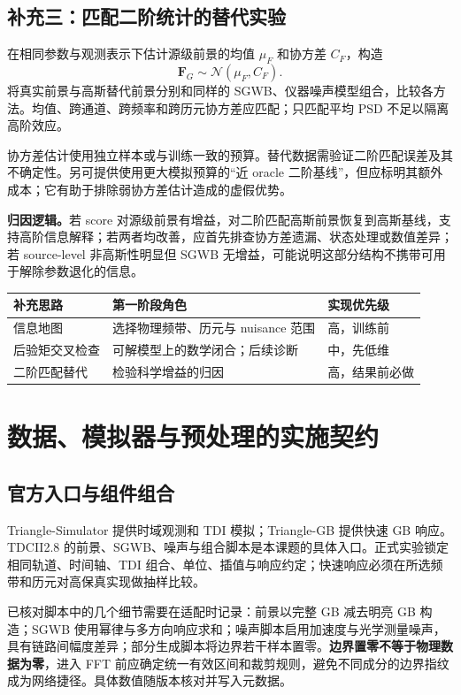 \documentclass[UTF8,fontset=fandol,a4paper,11pt]{ctexart}
\numberwithin{equation}{section}
\newcommand{\Normal}{\mathcal N}
\newcommand{\bF}{\boldsymbol F}
\begin{document}
\subsection{补充三：匹配二阶统计的替代实验}
在相同参数与观测表示下估计源级前景的均值 $\mu_F$ 和协方差 $C_F$，构造
\begin{equation}
\bF_G\sim\Normal(\mu_F,C_F).
\end{equation}
将真实前景与高斯替代前景分别和同样的 SGWB、仪器噪声模型组合，比较各方法。均值、跨通道、跨频率和跨历元协方差应匹配；只匹配平均 PSD 不足以隔离高阶效应。

协方差估计使用独立样本或与训练一致的预算。替代数据需验证二阶匹配误差及其不确定性。另可提供使用更大模拟预算的“近 oracle 二阶基线”，但应标明其额外成本；它有助于排除弱协方差估计造成的虚假优势。

\textbf{归因逻辑。}若 score 对源级前景有增益，对二阶匹配高斯前景恢复到高斯基线，支持高阶信息解释；若两者均改善，应首先排查协方差遗漏、状态处理或数值差异；若 source-level 非高斯性明显但 SGWB 无增益，可能说明这部分结构不携带可用于解除参数退化的信息。

\noindent\begin{tabularx}{\linewidth}{P{3cm}Y P{2.3cm}}
\toprule 补充思路 & 第一阶段角色 & 实现优先级\\\midrule
信息地图 & 选择物理频带、历元与 nuisance 范围 & 高，训练前\\
后验矩交叉检查 & 可解模型上的数学闭合；后续诊断 & 中，先低维\\
二阶匹配替代 & 检验科学增益的归因 & 高，结果前必做\\\bottomrule
\end{tabularx}

\section{数据、模拟器与预处理的实施契约}
\subsection{官方入口与组件组合}
Triangle-Simulator 提供时域观测和 TDI 模拟；Triangle-GB 提供快速 GB 响应\cite{simulator,gb}。TDCII2.8 的前景、SGWB、噪声与组合脚本是本课题的具体入口\cite{foreground,sgwb,noise,combine}。正式实验锁定相同轨道、时间轴、TDI 组合、单位、插值与响应约定；快速响应必须在所选频带和历元对高保真实现做抽样比较。

已核对脚本中的几个细节需要在适配时记录：前景以完整 GB 减去明亮 GB 构造；SGWB 使用幂律与多方向响应求和；噪声脚本启用加速度与光学测量噪声，具有链路间幅度差异；部分生成脚本将边界若干样本置零。\textbf{边界置零不等于物理数据为零}，进入 FFT 前应确定统一有效区间和裁剪规则，避免不同成分的边界指纹成为网络捷径。具体数值随版本核对并写入元数据。
\end{document}
